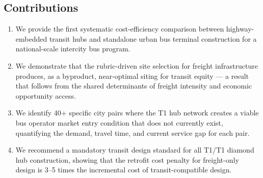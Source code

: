 \subsection*{Contributions}
\begin{enumerate}
  \item We provide the first systematic cost-efficiency comparison between highway-embedded transit hubs and standalone urban bus terminal construction for a national-scale intercity bus program.
  \item We demonstrate that the rubric-driven site selection for freight infrastructure produces, as a byproduct, near-optimal siting for transit equity --- a result that follows from the shared determinants of freight intensity and economic opportunity access.
  \item We identify 40+ specific city pairs where the T1 hub network creates a viable bus operator market entry condition that does not currently exist, quantifying the demand, travel time, and current service gap for each pair.
  \item We recommend a mandatory transit design standard for all T1/T1 diamond hub construction, showing that the retrofit cost penalty for freight-only design is 3--5 times the incremental cost of transit-compatible design.
\end{enumerate}
